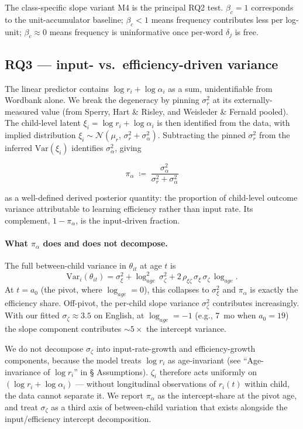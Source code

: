 \documentclass[11pt]{article}
\newcommand{\Var}{\mathrm{Var}}
\newcommand{\Norm}{\mathcal{N}}
\begin{document}
The class-specific slope variant M4 is the principal RQ2 test.
\(\beta_c = 1\) corresponds to the unit-accumulator baseline;
\(\beta_c < 1\) means frequency contributes less per log-unit;
\(\beta_c \approx 0\) means frequency is uninformative once per-word
\(\delta_j\) is free.

\subsection*{RQ3 — input- vs.\ efficiency-driven variance}
\label{sec:identifiability}

The linear predictor contains \(\log r_i + \log \alpha_i\) as a sum,
unidentifiable from Wordbank alone. We break the degeneracy by pinning
\(\sigma_r^2\) at its externally-measured value (from Sperry, Hart \&
Risley, and Weisleder \& Fernald pooled). The child-level latent
\(\xi_i = \log r_i + \log \alpha_i\) is then identified from the data,
with implied distribution
\(\xi_i \sim \Norm(\mu_r,\, \sigma_r^2 + \sigma_\alpha^2)\).
Subtracting the pinned \(\sigma_r^2\) from the inferred \(\Var(\xi_i)\)
identifies \(\sigma_\alpha^2\), giving

\begin{equation}
\pi_\alpha \;\coloneqq\; \frac{\sigma_\alpha^2}{\sigma_r^2 + \sigma_\alpha^2}
\end{equation}

as a well-defined derived posterior quantity: the proportion of
child-level outcome variance attributable to learning efficiency rather
than input rate. Its complement, \(1 - \pi_\alpha\), is the input-driven
fraction.

\paragraph{What \(\pi_\alpha\) does and does not decompose.}
The full between-child variance in \(\theta_{it}\) at age \(t\) is
\[
\Var_i(\theta_{it})
= \sigma_\xi^2
+ \log_{age}^2\,\sigma_\zeta^2
+ 2\,\rho_{\xi\zeta}\,\sigma_\xi\,\sigma_\zeta\,\log_{age}.
\]
At \(t = a_0\) (the pivot, where \(\log_{age} = 0\)), this collapses
to \(\sigma_\xi^2\) and \(\pi_\alpha\) is exactly the efficiency
share. Off-pivot, the per-child slope variance \(\sigma_\zeta^2\)
contributes increasingly. With our fitted \(\sigma_\zeta \approx 3.5\)
on English, at \(\log_{age} = -1\) (e.g., 7~mo when \(a_0 = 19\)) the
slope component contributes \(\sim 5\!\times\) the intercept variance.

We do not decompose \(\sigma_\zeta\) into input-rate-growth and
efficiency-growth components, because the model treats \(\log r_i\)
as age-invariant (see ``Age-invariance of \(\log r_i\)'' in §
Assumptions). \(\zeta_i\) therefore acts uniformly on
\((\log r_i + \log \alpha_i)\) — without longitudinal observations of
\(r_i(t)\) within child, the data cannot separate it. We report
\(\pi_\alpha\) as the intercept-share at the pivot age, and treat
\(\sigma_\zeta\) as a third axis of between-child variation that
exists alongside the input/efficiency intercept decomposition.
\end{document}
